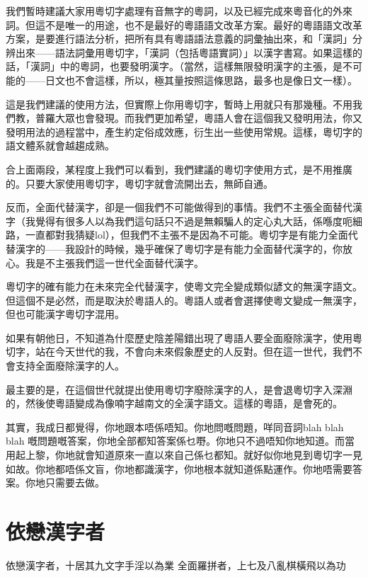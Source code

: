\documentclass[a5paper, 10pt, openany]{book} %
\begin{document}
我們暫時建議大家用粵切字處理有音無字的粵詞，以及已經完成來粵音化的外來詞。但這不是唯一的用途，也不是最好的粵語語文改革方案。最好的粵語語文改革方案，是要進行語法分析，把所有具有粵語語法意義的詞彙抽出來，和「漢詞」分辨出來——語法詞彙用粵切字，「漢詞（包括粵語實詞）」以漢字書寫。如果這樣的話，「漢詞」中的粵詞，也要發明漢字。（當然，這樣無限發明漢字的主張，是不可能的——日文也不會這樣，所以，極其量按照這條思路，最多也是像日文一樣）。

這是我們建議的使用方法，但實際上你用粵切字，暫時上用就只有那幾種。不用我們教，普羅大眾也會發現。而我們更加希望，粵語人會在這個我又發明用法，你又發明用法的過程當中，產生約定俗成效應，衍生出一些使用常規。這樣，粵切字的語文體系就會越趨成熟。

合上面兩段，某程度上我們可以看到，我們建議的粵切字使用方式，是不用推廣的。只要大家使用粵切字，粵切字就會流開出去，無師自通。

反而，全面代替漢字，卻是一個我們不可能做得到的事情。我們不主張全面替代漢字（我覺得有很多人以為我們這句話只不過是無賴騙人的定心丸大話，係喺度呃細路，一直都對我猜疑lol），但我們不主張不是因為不可能。粵切字是有能力全面代替漢字的——我設計的時候，幾乎確保了粵切字是有能力全面替代漢字的，你放心。我是不主張我們這一世代全面替代漢字。

粵切字的確有能力在未來完全代替漢字，使粵文完全變成類似諺文的無漢字語文。但這個不是必然，而是取決於粵語人的。粵語人或者會選擇使粵文變成一無漢字，但也可能漢字粵切字混用。

如果有朝他日，不知道為什麼歷史陰差陽錯出現了粵語人要全面廢除漢字，使用粵切字，站在今天世代的我，不會向未來假象歷史的人反對。但在這一世代，我們不會支持全面廢除漢字的人。

最主要的是，在這個世代就提出使用粵切字廢除漢字的人，是會退粵切字入深淵的，然後使粵語變成為像喃字越南文的全漢字語文。這樣的粵語，是會死的。



其實，我成日都覺得，你地跟本唔係唔知。你地問嘅問題，咩同音詞blah blah blah 嘅問題嘅答案，你地全部都知答案係乜嘢。你地只不過唔知你地知道。而當用起上黎，你地就會知道原來一直以來自己係乜都知。就好似你地見到粵切字一見如故。你地都唔係文盲，你地都識漢字，你地根本就知道係點運作。你地唔需要答案。你地只需要去做。


\chapter{依戀漢字者}
依戀漢字者，十居其九文字手淫以為業
全面羅拼者，上七及八亂棋橫飛以為功
\end{document}
